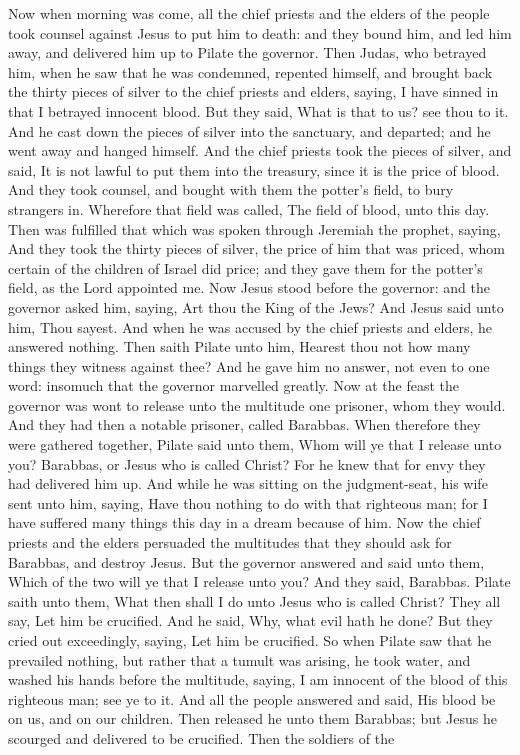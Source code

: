 Now when morning was come, all the chief priests and the elders of the people took counsel against Jesus to put him to death: and they bound him, and led him away, and delivered him up to Pilate the governor.  Then Judas, who betrayed him, when he saw that he was condemned, repented himself, and brought back the thirty pieces of silver to the chief priests and elders, saying, I have sinned in that I betrayed innocent blood. But they said, What is that to us? see thou to it. And he cast down the pieces of silver into the sanctuary, and departed; and he went away and hanged himself. And the chief priests took the pieces of silver, and said, It is not lawful to put them into the treasury, since it is the price of blood. And they took counsel, and bought with them the potter’s field, to bury strangers in. Wherefore that field was called, The field of blood, unto this day. Then was fulfilled that which was spoken through Jeremiah the prophet, saying, And they took the thirty pieces of silver, the price of him that was priced, whom certain of the children of Israel did price; and they gave them for the potter’s field, as the Lord appointed me.  Now Jesus stood before the governor: and the governor asked him, saying, Art thou the King of the Jews? And Jesus said unto him, Thou sayest. And when he was accused by the chief priests and elders, he answered nothing. Then saith Pilate unto him, Hearest thou not how many things they witness against thee? And he gave him no answer, not even to one word: insomuch that the governor marvelled greatly. Now at the feast the governor was wont to release unto the multitude one prisoner, whom they would. And they had then a notable prisoner, called Barabbas. When therefore they were gathered together, Pilate said unto them, Whom will ye that I release unto you? Barabbas, or Jesus who is called Christ? For he knew that for envy they had delivered him up. And while he was sitting on the judgment-seat, his wife sent unto him, saying, Have thou nothing to do with that righteous man; for I have suffered many things this day in a dream because of him. Now the chief priests and the elders persuaded the multitudes that they should ask for Barabbas, and destroy Jesus. But the governor answered and said unto them, Which of the two will ye that I release unto you? And they said, Barabbas. Pilate saith unto them, What then shall I do unto Jesus who is called Christ? They all say, Let him be crucified. And he said, Why, what evil hath he done? But they cried out exceedingly, saying, Let him be crucified. So when Pilate saw that he prevailed nothing, but rather that a tumult was arising, he took water, and washed his hands before the multitude, saying, I am innocent of the blood of this righteous man; see ye to it. And all the people answered and said, His blood be on us, and on our children. Then released he unto them Barabbas; but Jesus he scourged and delivered to be crucified.  Then the soldiers of the 